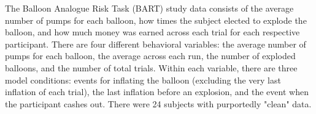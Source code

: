 \par \indent The Balloon Analogue Risk Task (BART) study data consists of the average number of pumps for each balloon, how times the subject elected to explode the balloon, and how much money was earned across each trial for each respective participant. There are four different behavioral variables: the average number of pumps for each balloon, the average across each run, the number of exploded balloons, and the number of total trials. Within each variable, there are three model conditions: events for inflating the balloon (excluding the very last inflation of each trial), the last inflation before an explosion, and the event when the participant cashes out. There were 24 subjects with purportedly "clean" data. 
